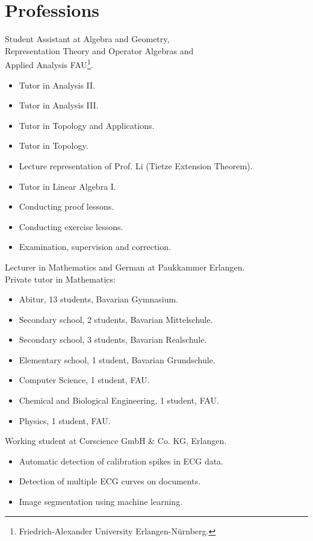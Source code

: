 \documentclass[a4paper, 11pt]{article}
\newcommand{\years}[1]{\marginnote{\scriptsize #1}}
\begin{document}
\section*{Professions}
\years{2023--25} Student Assistant at Algebra and Geometry, \\
Representation Theory and Operator Algebras and \\
Applied Analysis FAU\footnote{Friedrich-Alexander University Erlangen-Nürnberg.}.
\begin{itemize}
	\item Tutor in \glqq Analysis II\grqq.
	\item Tutor in \glqq Analysis III\grqq.
	\item Tutor in \glqq Topology and Applications\grqq.
	\item Tutor in \glqq Topology\grqq.
	\item Lecture representation of Prof. Li (Tietze Extension Theorem).
	\item Tutor in \glqq Linear Algebra I\grqq.
	\item Conducting proof lessons.
	\item Conducting exercise lessons.
	\item Examination, supervision and correction.
\end{itemize}
\years{2025} Lecturer in Mathematics and German at Paukkammer Erlangen.\\
\years{2024--25} Private tutor in Mathematics:
\begin{itemize}
	\item Abitur, 13 students, Bavarian Gymnasium.
	\item Secondary school, 2 students, Bavarian Mittelschule.
	\item Secondary school, 3 students, Bavarian Realschule.
	\item Elementary school, 1 student, Bavarian Grundschule.
	\item Computer Science, 1 student, FAU. 
	\item Chemical and Biological Engineering, 1 student, FAU. 
	\item Physics, 1 student, FAU. 
\end{itemize}
\years{2021--22} Working student at Corscience GmbH \& Co. KG, Erlangen.
\begin{itemize}
	\item Automatic detection of calibration spikes in ECG data.
	\item Detection of multiple ECG curves on documents.
	\item Image segmentation using machine learning.
\end{itemize}
\end{document}
